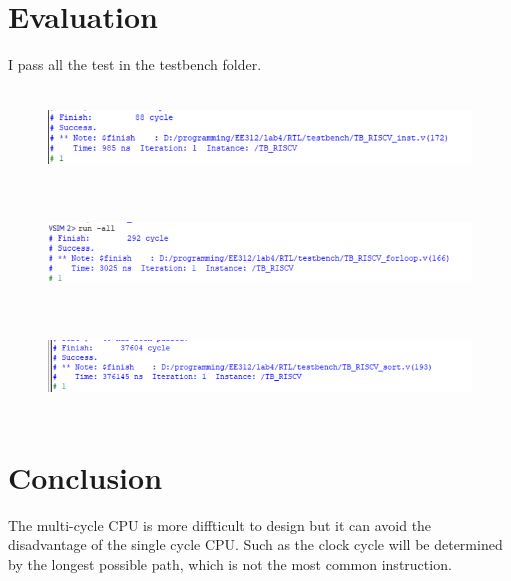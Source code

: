\documentclass[12pt,a4paper]{article}
\begin{document}
\section{Evaluation}

I pass all the test in the testbench folder.

\begin{figure}[H]
  \centering
  \includegraphics[height=1in]{inst.png}
  \end{figure}

\begin{figure}[H]
  \centering
  \includegraphics[height=1in]{forloop.png}
  \end{figure}

  \begin{figure}[H]
    \centering
    \includegraphics[height=1in]{sort.png}
    \end{figure}


\section{Conclusion}

The multi-cycle CPU is more diffticult to design but it can avoid the disadvantage of the single cycle CPU.
Such as the clock cycle will be determined by the longest possible path, which is not the most common instruction. 
\end{document}
